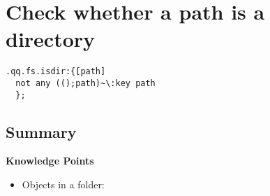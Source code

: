 \section{Check whether a path is a directory}

\begin{verbatim}
.qq.fs.isdir:{[path]
  not any (();path)~\:key path
  };
\end{verbatim}

\subsection{Summary}

\begin{noteblock}
\textbf{Knowledge Points}
\begin{itemize}
\item Objects in a folder: \href{https://code.kx.com/q/ref/key/#files-in-a-folder}{}
\end{itemize}
\end{noteblock}

\clearpage

